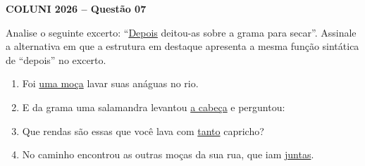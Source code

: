 \textbf{COLUNI 2026 -- Questão 07}\par\medskip Analise o seguinte excerto: “\underline{Depois} deitou-as sobre a grama para secar”. Assinale a alternativa em que a estrutura em destaque apresenta a mesma função sintática de “depois” no excerto.
\begin{enumerate}
\item Foi \underline{uma moça} lavar suas anáguas no rio.
\item E da grama uma salamandra levantou \underline{a cabeça} e perguntou:
\item Que rendas são essas que você lava com \underline{tanto} capricho?
\item No caminho encontrou as outras moças da sua rua, que iam \underline{juntas}.
\end{enumerate}

